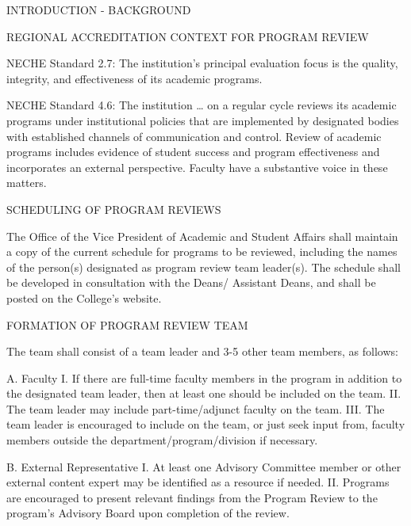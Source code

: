 INTRODUCTION - BACKGROUND

REGIONAL ACCREDITATION CONTEXT FOR PROGRAM REVIEW 

NECHE Standard 2.7: The institution’s principal evaluation focus is the quality, integrity, and effectiveness of its academic programs. 

NECHE Standard 4.6: The institution … on a regular cycle reviews its academic programs under institutional policies that are implemented by designated bodies with established channels of communication and control. Review of academic programs includes evidence of student success and program effectiveness and incorporates an external perspective. Faculty have a substantive voice in these matters. 


SCHEDULING OF PROGRAM REVIEWS 

The Office of the Vice President of Academic and Student Affairs shall maintain a copy of the current schedule for programs to be reviewed, including the names of the person(s) designated as program review team leader(s). The schedule shall be developed in consultation with the Deans/ Assistant Deans, and shall be posted on the College’s website. 

FORMATION OF PROGRAM REVIEW TEAM 

The team shall consist of a team leader and 3-5 other team members, as follows: 

A. Faculty 
I. If there are full-time faculty members in the program in addition to the designated team leader, then at least one should be included on the team. 
II. The team leader may include part-time/adjunct faculty on the team.
III. The team leader is encouraged to include on the team, or just seek input from, faculty members outside the department/program/division if necessary.

B. External Representative 
I. At least one Advisory Committee member or other external content expert may be identified as a resource if needed. 
II. Programs are encouraged to present relevant findings from the Program Review to the program’s Advisory Board upon completion of the review.




